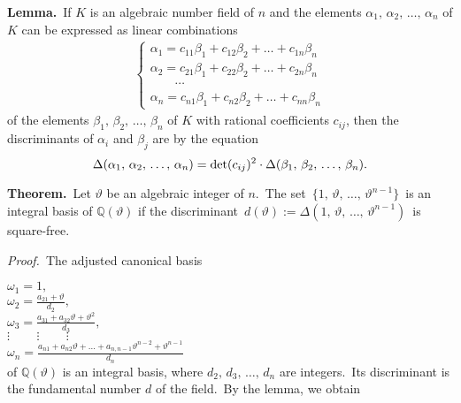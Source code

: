 \documentclass[12pt]{article}
\theoremstyle{definition}
\begin{document}
\textbf{Lemma.}\, If $K$ is an algebraic number field of  $n$ and the elements $\alpha_1,\,\alpha_2,\,\ldots,\,\alpha_n$ of $K$ can be expressed as linear combinations
\begin{align*}
\begin{cases}
\alpha_1 = c_{11}\beta_1+c_{12}\beta_2+\ldots+c_{1n}\beta_n\\
\alpha_2 = c_{21}\beta_1+c_{22}\beta_2+\ldots+c_{2n}\beta_n\\
\qquad\cdots\\
\alpha_n = c_{n1}\beta_1+c_{n2}\beta_2+\ldots+c_{nn}\beta_n
\end{cases}
\end{align*}
of the elements $\beta_1,\,\beta_2,\,\ldots,\,\beta_n$ of $K$ with rational coefficients $c_{ij}$, then the discriminants of $\alpha_i$ and $\beta_j$ are  by the equation
$$\Delta(\alpha_1,\,\alpha_2,\,\ldots,\,\alpha_n) = \det(c_{ij})^2\cdot\Delta(\beta_1,\,\beta_2,\,\ldots,\,\beta_n).\\$$

\textbf{Theorem.}\, Let $\vartheta$ be an algebraic integer of  $n$.\, The set\, $\{1,\,\vartheta,\,\ldots,\,\vartheta^{n-1}\}$\, is an integral basis of $\mathbb{Q}(\vartheta)$ if the discriminant \,$d(\vartheta) := \Delta(1,\,\vartheta,\,\ldots,\,\vartheta^{n-1})$\, is square-free.

{\em Proof.}\, The adjusted canonical basis

$\displaystyle\omega_1 = 1,$\\
$\displaystyle\omega_2 = \frac{a_{21}\!+\!\vartheta}{d_2},$\\
$\displaystyle\omega_3 = \frac{a_{31}\!+\!a_{32}\vartheta\!+\!\vartheta^2}{d_3},$\\
$\vdots\,\qquad\vdots\,\qquad\vdots$\\
$\displaystyle\omega_n = \frac{a_{n1}\!+\!a_{n2}\vartheta\!+\ldots+\!a_{n,n-1}\vartheta^{n-2}\!+\!\vartheta^{n-1}}{d_n}$\\

\noindent of $\mathbb{Q}(\vartheta)$ is an integral basis, where $d_2,\,d_3,\,\ldots,\,d_n$ are integers.\, Its discriminant is the fundamental number $d$ of the field.\, By the lemma, we obtain
\end{document}
